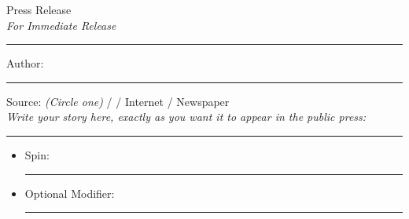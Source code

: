 \documentclass[white]{LRSguildcamp1}
\begin{document}
\name{\wPressRelease{}}

\begin{center}
\Huge{Press Release}\\
\large{\emph{For Immediate Release}}\\
\end{center}
\hrule
\vspace{10mm}
\Large{Author: \rule{12cm}{0.4pt}}\newline
\vspace{5mm}
\large{Source: \emph{(Circle one)} \cHeroLeague{} / \cVillainCompact{} / Internet / Newspaper}\\

\emph{Write your story here, exactly as you want it to appear in the public press:}

\vfill
\hrule
\vspace{10mm}
{\bf
\begin{itemize}
	\item Spin: \rule{12cm}{0.4pt}
	\item Optional Modifier: \rule{12cm}{0.4pt}
\end{itemize}
}
\end{document}

